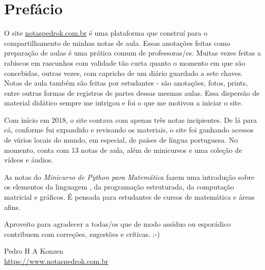 
\section*{Prefácio}\label{prefacio}

O site \href{https://www.notaspedrok.com.br}{notaspedrok.com.br} é uma plataforma que construí para o compartilhamento de minhas notas de aula. Essas anotações feitas como preparação de aulas é uma prática comum de professoras/es. Muitas vezes feitas a rabiscos em rascunhos com validade tão curta quanto o momento em que são concebidas, outras vezes, com capricho de um diário guardado a sete chaves. Notas de aula também são feitas por estudantes - são anotações, fotos, prints, entre outras formas de registros de partes dessas mesmas aulas. Essa dispersão de material didático sempre me intrigou e foi o que me motivou a iniciar o site.

Com início em 2018, o site contava com apenas três notas incipientes. De lá para cá, conforme fui expandido e revisando os materiais, o site foi ganhando acessos de vários locais do mundo, em especial, de países de língua portuguesa. No momento, conta com 13 notas de aula, além de minicursos e uma coleção de vídeos e áudios.

As notas do \emph{Minicurso de Python para Matemática} fazem uma introdução sobre os elementos da linguagem {\python}, da programação estruturada, da computação matricial e gráficos. É pensada para estudantes de cursos de matemática e áreas afins.

Aproveito para agradecer a todas/os que de modo assíduo ou esporádico contribuem com correções, sugestões e críticas. ;-)

\begin{flushright}
  Pedro H A Konzen\\\url{https://www.notaspedrok.com.br}
\end{flushright}

